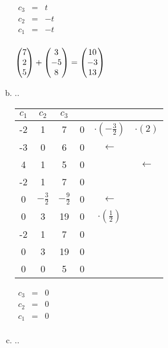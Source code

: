 \begin{enumerate}[a)]
						
						
							$\begin{array} {ccc}
								c_3 & = & t\\
								c_2 & = & -t\\
								c_1 & = & -t\\
							\end{array}$
						
						
						
							$\mvect{7\\2\\5} + \mvect{3\\-5\\8} = \mvect{10\\-3\\13}$
						
						
				    \item ..
				    	
							\begin{tabular} {ccc|ccc}
								$c_1$ & $c_2$ & $c_3$ & & &\\
								\hline
								-2 & 1 & 7 & 0 & $\cdot(-\frac{3}{2})$ & $\cdot(2)$ \\
								-3 & 0 & 6 & 0 & $\leftarrow$ & \\
								4 & 1 & 5 & 0 & & $\leftarrow$ \\
								\hline
								-2 & 1 & 7 & 0 & & \\
								0 & $-\frac{3}{2}$ & $-\frac{9}{2}$ & 0 & $\leftarrow$ & \\
								0 & 3 & 19 & 0 & $\cdot(\frac{1}{2})$ & \\
								\hline
								-2 & 1 & 7 & 0 & & \\
								0 & 3 & 19 & 0 & & \\
								0 & 0 & 5 & 0 & & \\
							\end{tabular}
						
						
						
							$\begin{array} {ccc}
								c_3 & = & 0\\
								c_2 & = & 0\\
								c_1 & = & 0\\
							\end{array}$
						

				    \item ..
				  		

\end{enumerate}
